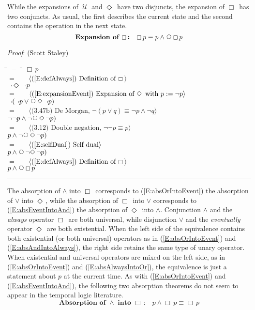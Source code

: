 \documentclass[12pt, fleqn, leqno]{article}
\newcommand{\lgap}{2pt}                             %
\newcommand{\mymathindent}{24pt}                    %
\newcommand{\Until}{\;\mathcal{U}\;}
\newcommand{\Next}{\;\,\text{\raisebox{3.5pt}{\circle{6}}}}
\newcommand{\Event}{\Diamond\,}
\newcommand{\Always}{\Box\,}
\newcommand{\myqed}{\rule[-.23ex]{1.2ex}{2.0ex}}
\newcommand{\myqedtab}{\hspace{384pt}}              %
\newcommand{\Gll} {\langle}                         %
\newcommand{\Ggg} {\rangle}                         %
\newcommand{\Hint}[1]     {\ \ \ $\Gll              \mbox{#1} \Ggg$ }   %
\begin{document}
While the expansions of $\Until$ and $\Event$ have two disjuncts,
the expansion of $\Always$ has two conjuncts.
As usual, the first describes the current state and the second contains the operation in the next state.
\begin{equation}\label{E:expansionAlways}
\textbf{Expansion of $\Always$:}\quad \Always p \equiv p \land \Next\Always p
\end{equation}

\emph{Proof}: (Scott Staley)
\begin{tabbing}
\hspace{\mymathindent} \= $= \;$ \= \myqedtab \= \kill
  \> \>   $\Always p$\\[\lgap]
  \> $=$  \>  \Hint{(\ref{E:defAlways}) Definition of $\Always$}\\[\lgap]
  \> \>   $\neg\Event\neg p$\\[\lgap]
  \> $=$  \>  \Hint{(\ref{E:expansionEvent}) Expansion of $\Event$ with $p := \neg p$}\\[\lgap]
  \> \>   $\neg(\neg p\lor\Next\Event\neg p)$\\[\lgap]
  \> $=$  \>  \Hint{(3.47b) De Morgan, $\neg (p \lor q) \equiv \neg p \land \neg q$}\\[\lgap]
  \> \>   $\neg\neg p\land\neg\Next\Event\neg p)$\\[\lgap]
  \> $=$  \>  \Hint{(3.12) Double negation, $\neg\neg p \equiv p$}\\[\lgap]
  \> \>   $p\land\neg\Next\Event\neg p)$\\[\lgap]
  \> $=$  \>  \Hint{(\ref{E:selfDual}) Self dual}\\[\lgap]
  \> \>   $p\land\Next\neg\Event\neg p)$\\[\lgap]
  \> $=$  \>  \Hint{(\ref{E:defAlways}) Definition of $\Always$}\\[\lgap]
  \> \>   $p \land \Next\Always p$ \quad \myqed
\end{tabbing}

The absorption of $\land$ into $\Always$ corresponds to (\ref{E:absOrIntoEvent}) the absorption of $\lor$ into $\Event$,
while the absorption of $\Always$ into $\lor$ corresponds to (\ref{E:absEventIntoAnd}) the absorption of $\Event$ into $\land$.
Conjunction $\land$ and the \textit{always} operator $\Always$ are both universal, while
disjunction $\lor$ and the \textit{eventually} operator $\Event$ are both existential.
When the left side of the equivalence contains both existential (or both universal) operators as in (\ref{E:absOrIntoEvent}) and (\ref{E:absAndIntoAlways}),
the right side retains the same type of unary operator.
When existential and universal operators are mixed on the left side,
as in (\ref{E:absOrIntoEvent}) and (\ref{E:absAlwaysIntoOr}), the equivalence is just a statement about $p$ at the current time.
As with (\ref{E:absOrIntoEvent}) and (\ref{E:absEventIntoAnd}), the following two absorption theorems
do not seem to appear in the temporal logic literature.
\begin{equation}\label{E:absAndIntoAlways}
\textbf{Absorption of $\land$ into $\Always$:}\quad p \land \Always p \equiv \Always p
\end{equation}
\end{document}

